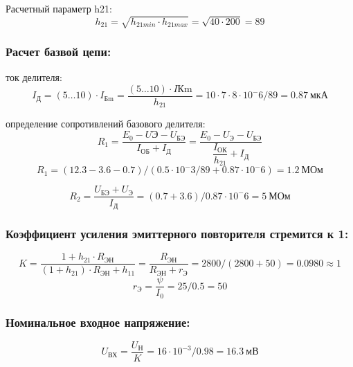 Расчетный параметр h21:
\begin{equation}
   \label{eq:equation6_15}
h_{21}=\sqrt{h_{21min} \cdot h_{21max}}=\sqrt{40 \cdot 200}=89
\end{equation} 

 \subsubsection{Расчет базвой цепи:}
ток делителя:
 \begin{equation}
   \label{eq:equation6_16}
 I_{\text{Д}}=(5 \ldots 10) \cdot I_{\text{Бm}}=\dfrac{(5 \ldots 10) \cdot I{\text{Кm}}}{h_21}=10 \cdot 7 \cdot 8\cdot 10^-6 /89=0.87~\text{мкА}
 \end{equation}

 определение сопротивлений базового делителя:
 \begin{equation}
   \label{eq:equation6_17}
   R_1=\dfrac{E_0-U{\text{Э}}-U_{\text{БЭ}}}{I_{\text{ОБ}}+I_{\text{Д}}}=\dfrac{E_0-U_{\text{Э}}-U_{\text{БЭ}}}{ \dfrac{I_{\text{ОК}}}{ h_{21}}+I_{\text{Д}} }
   \end{equation}
   \begin{equation*}
   R_1=(12.3-3.6-0.7)/(0.5 \cdot 10^-3/89+0.87 \cdot 10^-6)=1.2~\text{МОм}
   \end{equation*}

 \begin{equation}
   \label{eq:equation6_17}
   R_2=\dfrac{U_{\text{БЭ}}+U_{\text{Э}}}{I_{\text{Д}}}=(0.7+3.6)/0.87 \cdot 10^-6=5~\text{МОм}
 \end{equation}
\subsubsection{Коэффициент усиления эмиттерного повторителя стремится к 1:}
\begin{equation}
   \label{eq:equation6_18}
K=\dfrac{1+h_21 \cdot R_{\text{ЭН}}}{(1+h_21)\cdot R_{\text{ЭН}}+h_11}=\dfrac{R_{\text{ЭН}}}{R_{\text{ЭН}}+{r_{\text{Э}}}}=2800/(2800+50)=0.0980 \approx 1
\end{equation}
\begin{equation}
   \label{eq:equation6_19}
   r_{\text{Э}}=\dfrac{\psi}{I_0}=25/0.5=50
\end{equation}
\subsubsection{Номинальное входное напряжение:}
\begin{equation}
   \label{eq:equation6_20}
U_{\text{ВХ}}=\dfrac {U_{\text{Н}}}{K}=16 \cdot 10^{-3} /0.98= 16.3~\text {мВ}
\end{equation}
